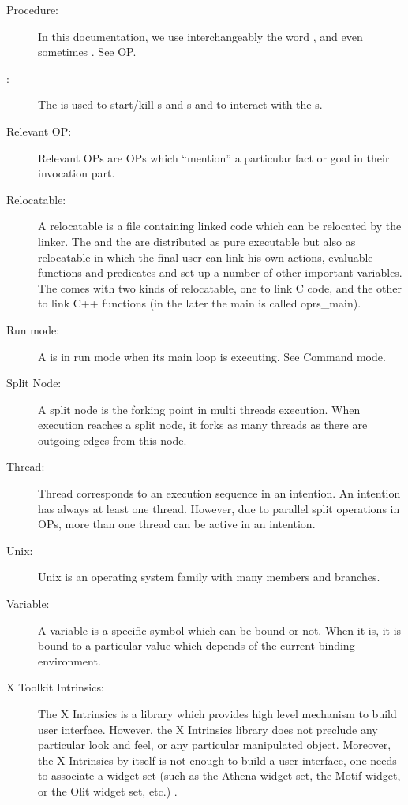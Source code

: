 \begin{description}
\item[Procedure:] In this documentation, we use interchangeably the
word ,  and even sometimes . See OP.

\item[\OPRSS{}:] The \OPRSS{} is used to start/kill \CPK{}s and
\XPK{}s and to interact with the \CPK{}s.

\item[Relevant OP:] Relevant OPs are OPs which ``mention'' a particular fact or
goal in their invocation part. 

\item[Relocatable:] A relocatable is a file containing linked code which can be
relocated by the linker. The \CPK{} and the \XPK{} are distributed as pure
executable but also as relocatable in which the final user can link his own
actions, evaluable functions and predicates and set up a number of other
important variables. The \COPRSDE{} comes with two kinds of relocatable, one to
link C code, and the other to link C++ functions (in the later the main is
called oprs\_main).

\item[Run mode:] A \CPK{} is in run mode when its main loop is executing. See
Command mode. 

\item[Split Node:] A split node is the forking point in multi threads
execution.  When execution reaches a split node, it forks as many threads as
there are outgoing edges from this node.

\item[Thread:] Thread corresponds to an execution sequence in an intention. An
intention has always at least one thread. However, due to parallel split
operations in OPs, more than one thread can be active in an intention.

\item[Unix:] Unix is an operating system family with many members and branches.

\item[Variable:] A variable is a specific symbol which can be bound or not.
When it is, it is bound to a particular value which depends of the current
binding environment.

\item[X Toolkit Intrinsics:] The X Intrinsics is a library which provides high
level mechanism to build user interface. However, the X Intrinsics library does
not preclude any particular look and feel, or any particular manipulated
object. Moreover, the X Intrinsics by itself is not enough to build a user
interface, one needs to associate a widget set (such as the Athena widget set,
the Motif widget, or the Olit widget set, etc.) \cite{Xt-manual}.


\end{description}
